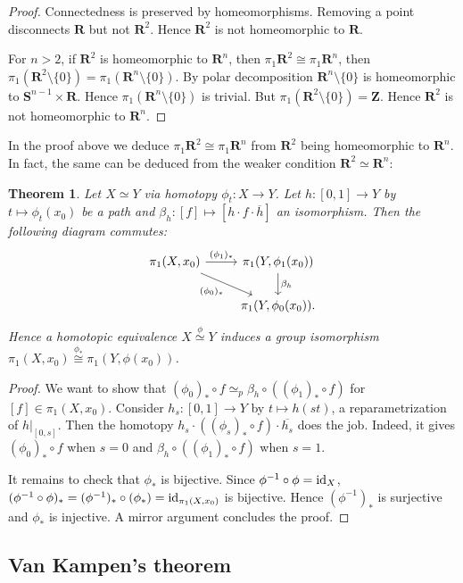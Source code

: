 \documentclass[11pt]{article}
\theoremstyle{definition}
\theoremstyle{plain}
\newtheorem{theorem}{Theorem}[section]
\theoremstyle{remark}
\newcommand{\id}{\textup{id}}
\newcommand{\R}{\mathbf{R}}
\newcommand{\Z}{\mathbf{Z}}
\begin{document}
\begin{proof}
Connectedness is preserved by homeomorphisms. Removing a point disconnects $\R$ but not $\R^2$. Hence $\R^2$ is not homeomorphic to $\R$.\medbreak

For $n>2$, if $\R^2$ is homeomorphic to $\R^n$, then $\pi_1\R^2\cong\pi_1\R^n$, then $\pi_1(\R^2\setminus\{0\})=\pi_1(\R^n\setminus\{0\})$. By polar decomposition $\R^n\setminus\{0\}$ is homeomorphic to $\mathbf{S}^{n-1}\times\R$. Hence $\pi_1(\R^n\setminus\{0\})$ is trivial. But $\pi_1(\R^2\setminus\{0\})=\Z$. Hence $\R^2$ is not homeomorphic to $\R^n$.
\end{proof}

In the proof above we deduce $\pi_1\R^2\cong\pi_1\R^n$ from $\R^2$ being homeomorphic to $\R^n$. In fact, the same can be deduced from the weaker condition $\R^2\simeq\R^n$:

\begin{theorem}
Let $X\simeq Y$ via homotopy $\phi_t:X\to Y$. Let $h:[0,1]\to Y$ by $t\mapsto\phi_t(x_0)$ be a path and $\beta_h:[f]\mapsto[h\cdot f\cdot\overline{h}]$ an isomorphism. Then the following diagram commutes:
\[\begin{tikzcd}
\pi_1(X,x_0)\arrow[swap]{dr}{(\phi_0)_\ast}\arrow{r}{(\phi_1)_\ast}&\pi_1(Y,\phi_1(x_0))\arrow{d}{\beta_h}\\
&\pi_1(Y,\phi_0(x_0)).
\end{tikzcd}\]
Hence a homotopic equivalence $X\stackrel{\text{$\phi$}}{\simeq}Y$ induces a group isomorphism $\pi_1(X,x_0)\stackrel{\text{$\phi_\ast$}}{\cong}\pi_1(Y,\phi(x_0))$.
\end{theorem}
\begin{proof}
We want to show that $(\phi_0)_\ast\circ f\simeq_p\beta_h\circ((\phi_1)_\ast\circ f)$ for $[f]\in\pi_1(X,x_0)$. Consider $h_s:[0,1]\to Y$ by $t\mapsto h(st)$, a reparametrization of $h|_{[0,s]}$. Then the homotopy $h_s\cdot((\phi_s)_\ast\circ f)\cdot\overline{h_s}$ does the job. Indeed, it gives $(\phi_0)_\ast\circ f$ when $s=0$ and $\beta_h\circ((\phi_1)_\ast\circ f)$ when $s=1$.\medbreak

It remains to check that $\phi_\ast$ is bijective. Since $\phi^{-1}\circ\phi=\id_X$, $(\phi^{-1}\circ\phi)_\ast=(\phi^{-1})_\ast\circ(\phi_\ast)=\id_{\pi_1(X,x_0)}$ is bijective. Hence $(\phi^{-1})_\ast$ is surjective and $\phi_\ast$ is injective. A mirror argument concludes the proof.
\end{proof}

\subsection{Van Kampen's theorem}\label{7}
\end{document}

